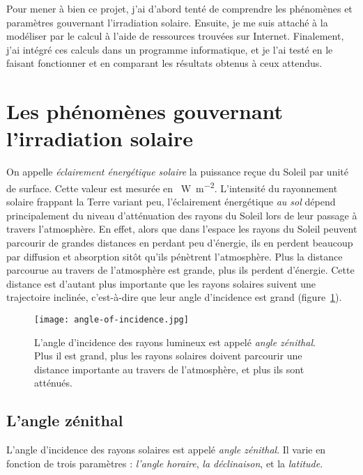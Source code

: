 \documentclass[12pt]{article}
\begin{document}
\vspace{0.5cm}

Pour mener à bien ce projet, j'ai d'abord tenté de comprendre les phénomènes et paramètres gouvernant l'irradiation solaire.
Ensuite, je me suis attaché à la modéliser par le calcul à l'aide de ressources trouvées sur Internet.
Finalement, j'ai intégré ces calculs dans un programme informatique, et je l'ai testé en le faisant fonctionner et en comparant les résultats obtenus à ceux attendus.



\clearpage
\section{Les phénomènes gouvernant l'irradiation solaire}

On appelle \emph{éclairement énergétique solaire} la puissance reçue du Soleil par unité de surface.
Cette valeur est mesurée en \SI{}{\watt\per\square\meter}.
L'intensité du rayonnement solaire frappant la Terre variant peu, l'éclairement énergétique \emph{au sol} dépend principalement du niveau d'atténuation des rayons du Soleil lors de leur passage à travers l'atmosphère.
En effet, alors que dans l'espace les rayons du Soleil peuvent parcourir de grandes distances en perdant peu d'énergie, ils en perdent beaucoup par diffusion et absorption sitôt qu'ils pénètrent l'atmosphère.
Plus la distance parcourue au travers de l'atmosphère est grande, plus ils perdent d'énergie.
Cette distance est d'autant plus importante que les rayons solaires suivent une trajectoire inclinée, c'est-à-dire que leur angle d'incidence est grand (figure~\ref{fig:angle-of-incidence}).

 \begin{figure}[H]
	\centerline{\texttt{[image: angle-of-incidence.jpg]}}
	\caption{L'angle d'incidence des rayons lumineux est appelé \emph{angle zénithal}. Plus il est grand, plus les rayons solaires doivent parcourir une distance importante au travers de l'atmosphère, et plus ils sont atténués.}
	\label{fig:angle-of-incidence}
\end{figure}

\subsection{L'angle zénithal}
L'angle d'incidence des rayons solaires est appelé \emph{angle zénithal}.
Il varie en fonction de trois paramètres : \emph{l'angle horaire}, \emph{la déclinaison}, et la \emph{latitude}.
\end{document}
